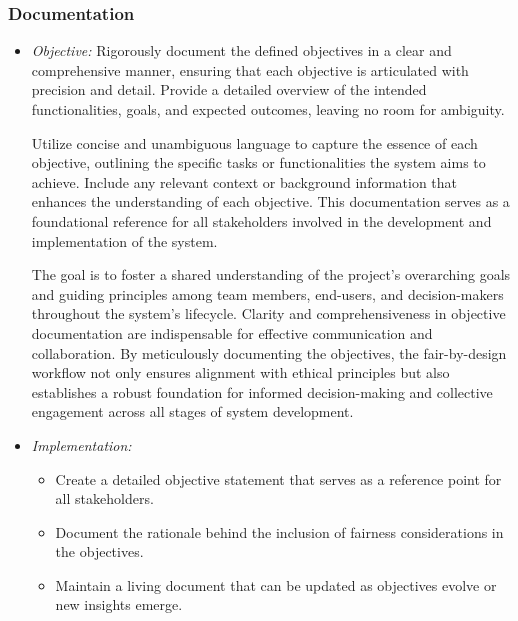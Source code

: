\documentclass[12pt,a4paper,openright,twoside]{book}
\begin{document}
\subsubsection{Documentation}

\begin{itemize}

    \item \emph{Objective:} Rigorously document the defined objectives in a clear and comprehensive manner, ensuring that each objective is articulated with precision and detail. Provide a detailed overview of the intended functionalities, goals, and expected outcomes, leaving no room for ambiguity.

    Utilize concise and unambiguous language to capture the essence of each objective, outlining the specific tasks or functionalities the system aims to achieve. Include any relevant context or background information that enhances the understanding of each objective. This documentation serves as a foundational reference for all stakeholders involved in the development and implementation of the system.

    The goal is to foster a shared understanding of the project's overarching goals and guiding principles among team members, end-users, and decision-makers throughout the system's lifecycle. Clarity and comprehensiveness in objective documentation are indispensable for effective communication and collaboration. By meticulously documenting the objectives, the fair-by-design workflow not only ensures alignment with ethical principles but also establishes a robust foundation for informed decision-making and collective engagement across all stages of system development.
    
    \item \emph{Implementation:}

        \begin{itemize}

            \item Create a detailed objective statement that serves as a reference point for all stakeholders.

            \item Document the rationale behind the inclusion of fairness considerations in the objectives.

            \item Maintain a living document that can be updated as objectives evolve or new insights emerge.

        \end{itemize}

\end{itemize}
\end{document}

